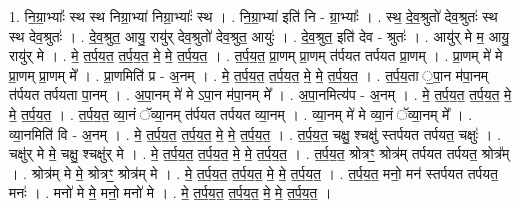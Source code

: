 \documentclass[17pt]{extarticle}
\begin{document}
1. नि॒ग्रा॒भ्याः᳚ स्थ स्थ निग्रा॒भ्या॑ निग्रा॒भ्याः᳚ स्थ । . नि॒ग्रा॒भ्या॑ इति॑ नि - ग्रा॒भ्याः᳚ । . स्थ॒ दे॒व॒श्रुतो॑ देव॒श्रुतः॑ स्थ स्थ देव॒श्रुतः॑ । . दे॒व॒श्रुत॒ आयु॒ रायु॑र् देव॒श्रुतो॑ देव॒श्रुत॒ आयुः॑ । . दे॒व॒श्रुत॒ इति॑ देव - श्रुतः॑ । . आयु॑र् मे म॒ आयु॒ रायु॑र् मे । . मे॒ त॒र्प॒य॒त॒ त॒र्प॒य॒त॒ मे॒ मे॒ त॒र्प॒य॒त॒ । . त॒र्प॒य॒त॒ प्रा॒णम् प्रा॒णम् त॑र्पयत तर्पयत प्रा॒णम् । . प्रा॒णम् मे॑ मे प्रा॒णम् प्रा॒णम् मे᳚ । . प्रा॒णमिति॑ प्र - अ॒नम् । . मे॒ त॒र्प॒य॒त॒ त॒र्प॒य॒त॒ मे॒ मे॒ त॒र्प॒य॒त॒ । . त॒र्प॒य॒ता ॒पा॒न म॑पा॒नम् त॑र्पयत तर्पयता पा॒नम् । . अ॒पा॒नम् मे॑ मे ऽपा॒न म॑पा॒नम् मे᳚ । . अ॒पा॒नमित्य॑प - अ॒नम् । . मे॒ त॒र्प॒य॒त॒ त॒र्प॒य॒त॒ मे॒ मे॒ त॒र्प॒य॒त॒ । . त॒र्प॒य॒त॒ व्या॒नं ॅव्या॒नम् त॑र्पयत तर्पयत व्या॒नम् । . व्या॒नम् मे॑ मे व्या॒नं ॅव्या॒नम् मे᳚ । . व्या॒नमिति॑ वि - अ॒नम् । . मे॒ त॒र्प॒य॒त॒ त॒र्प॒य॒त॒ मे॒ मे॒ त॒र्प॒य॒त॒ । . त॒र्प॒य॒त॒ चक्षु॒ श्चक्षु॑ स्तर्पयत तर्पयत॒ चक्षुः॑ । . चक्षु॑र् मे मे॒ चक्षु॒ श्चक्षु॑र् मे । . मे॒ त॒र्प॒य॒त॒ त॒र्प॒य॒त॒ मे॒ मे॒ त॒र्प॒य॒त॒ । . त॒र्प॒य॒त॒ श्रोत्रꣳ॒॒ श्रोत्र॑म् तर्पयत तर्पयत॒ श्रोत्र᳚म् । . श्रोत्र॑म् मे मे॒ श्रोत्रꣳ॒॒ श्रोत्र॑म् मे । . मे॒ त॒र्प॒य॒त॒ त॒र्प॒य॒त॒ मे॒ मे॒ त॒र्प॒य॒त॒ । . त॒र्प॒य॒त॒ मनो॒ मन॑ स्तर्पयत तर्पयत॒ मनः॑ । . मनो॑ मे मे॒ मनो॒ मनो॑ मे । . मे॒ त॒र्प॒य॒त॒ त॒र्प॒य॒त॒ मे॒ मे॒ त॒र्प॒य॒त॒ । \newline
\end{document}
